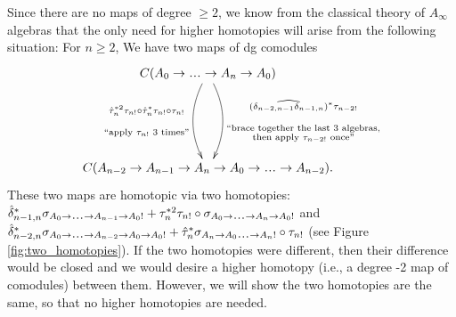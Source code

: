 Since there are no maps of degree 
$\geq2$, we know from the classical 
theory of $A_\infty$ algebras that 
the only need for higher homotopies 
will arise from the following 
situation: For $n\geq2$, 
We have two maps of dg comodules
\begin{equation}
\label{eq:two_maps}
\xymatrixrowsep{5pc}
\xymatrix{
C(A_0 \to \smdots \to A_n \to A_0) 
 \ar@/^1pc/[d]^{\substack{
   (\widehat{\delta_{n-2,n-1}\delta_{n-1,n}})^*
   \tau_{n-2!}\\\\\\
   \textrm{$``$brace together the last 3 algebras,}\\
   \textrm{then apply $\tau_{n-2!}$ once''}}}
 \ar@/_1pc/[d]_{\substack{
   \hat{\tau}_n^{*2} \tau_{n!}\circ
   \hat{\tau}_n^*\tau_{n!}\circ \tau_{n!}\\\\\\
   \textrm{$``$apply $\tau_{n!}$ 3 times''}}}\\
C(A_{n-2} \to A_{n-1} \to A_n \to 
A_0 \to \smdots \to A_{n-2}).
}
\end{equation}
These two maps are homotopic via 
two homotopies: 
$\hat{\delta}_{n-1,n}^*
\sigma_{A_0 \to \smdots \to A_{n-1}\to A_0!}
+ \tau_n^{*2}\tau_{n!} \circ 
\sigma_{A_0 \to \smdots \to A_n\to A_0!}$ 
and 
$\hat{\delta}_{n-2,n}^*
\sigma_{A_0 \to \smdots \to A_{n-2}\to A_0 \to A_0!} +
\hat{\tau}_n^*\sigma_{A_n \to A_0 \smdots \to A_n!}
\circ \tau_{n!}$ (see Figure 
\ref{fig:two_homotopies}). If the 
two homotopies were different, then 
their difference would be closed and
we would desire a higher homotopy (i.e., 
a degree -2 map of comodules) between 
them. However, we will show the 
two homotopies are the same, so that 
no higher homotopies are needed.
%
